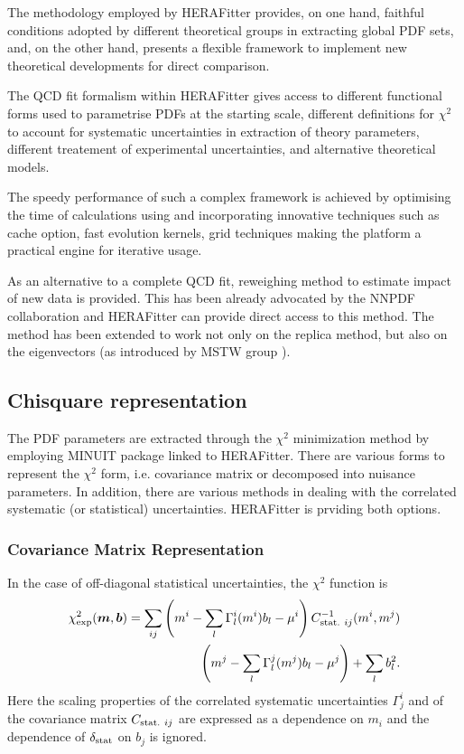 
The methodology employed by HERAFitter provides,  
 on one hand, faithful conditions adopted by different theoretical 
groups in extracting global PDF sets, and, on the other hand,  presents
a flexible framework to implement new theoretical developments for 
direct comparison.

The QCD fit formalism within HERAFitter gives access to different functional 
forms used to parametrise PDFs at the starting scale, different definitions for $\chi^2$ to account for systematic uncertainties in extraction of theory parameters, different treatement of experimental uncertainties, and alternative theoretical models. 

The speedy performance of such a complex framework is achieved by optimising the time of calculations using and incorporating innovative techniques such as cache option, fast evolution kernels, grid techniques making the platform a practical engine for iterative usage.

As an alternative to a complete QCD fit, reweighing method to estimate impact of new data is provided. This has been already advocated by the NNPDF collaboration \cite{PDFreplicareweighing} and HERAFitter can provide direct access to this method. The method has been extended to work not only on the replica method, but also on the eigenvectors (as introduced by MSTW group \cite{PDFeigreweighing}).





\subsection{Chisquare representation}

The PDF parameters are extracted through the $\chi^2$ minimization method by 
employing MINUIT package linked to HERAFitter. There are various forms to represent the $\chi^2$ form, i.e. covariance matrix or decomposed into nuisance parameters. In addition, there are various methods in dealing with the correlated systematic (or statistical) uncertainties.
HERAFitter is prviding both options.

\subsubsection{Covariance Matrix Representation}

In the case of off-diagonal statistical uncertainties, the $\chi^2$ function
is
\begin{align} 
 \label{eq:chi2gen}
    \chi^2_{\rm exp} (\boldsymbol{m},\boldsymbol{b}) = \sum_{ij} 
         \left ( m^i - \sum_l \Gamma^i_l(m^i)b_l - \mu^i \right) C^{-1}_{{\rm stat.}~ij}(m^i,m^j) \nonumber \\
     \left(  m^j - \sum_l \Gamma^j_l(m^j)b_l - \mu^j \right) +  \sum_l b^2_l.
\end{align}
Here the scaling properties of the correlated systematic uncertainties 
$\Gamma^i_j$ and
of the covariance matrix $C_{{\rm stat.}~ij}$ are expressed as a dependence
on $m_i$ and the dependence of $\delta_{\rm stat}$ on $b_j$ is ignored.

